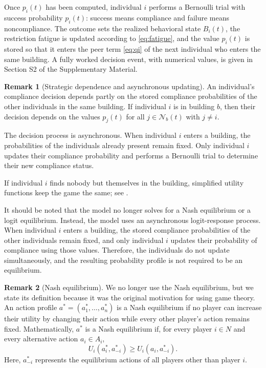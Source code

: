 \documentclass[11pt]{article}
\theoremstyle{definition}
\newtheorem{remark}{Remark}[section]
\theoremstyle{plain}
\begin{document}
Once $p_i(t)$ has been computed, individual $i$ performs a Bernoulli trial with success probability $p_i(t)$: success means compliance and failure means noncompliance. The outcome sets the realized behavioral state $B_i(t)$, the restriction fatigue is updated according to \eqref{eq:fatigue}, and the value $p_i(t)$ is stored so that it enters the peer term \eqref{eq:qi} of the next individual who enters the same building. A fully worked decision event, with numerical values, is given in Section S2 of the Supplementary Material.

\begin{remark}[Strategic dependence and asynchronous updating]
\label{rem:async}
An individual's compliance decision depends partly on the stored compliance probabilities of the other individuals in the same building. If individual $i$ is in building $b$, then their decision depends on the values $p_j(t)$ for all $j\in\mathcal{N}_b(t)$ with $j\neq i$.

The decision process is asynchronous. When individual $i$ enters a building, the probabilities of the individuals already present remain fixed. Only individual $i$ updates their compliance probability and performs a Bernoulli trial to determine their new compliance status.

If individual $i$ finds nobody but themselves in the building, simplified utility functions keep the game the same; see .

It should be noted that the model no longer solves for a Nash equilibrium or a logit equilibrium. Instead, the model uses an asynchronous logit-response process. When individual $i$ enters a building, the stored compliance probabilities of the other individuals remain fixed, and only individual $i$ updates their probability of compliance using those values. Therefore, the individuals do not update simultaneously, and the resulting probability profile is not required to be an equilibrium.
\end{remark}

\begin{remark}[Nash equilibrium]
\label{rem:nash}
We no longer use the Nash equilibrium, but we state its definition because it was the original motivation for using game theory.
An action profile $a^*=(a_1^*,\ldots,a_n^*)$ is a Nash equilibrium if no player can increase their utility by changing their action while every other player's action remains fixed. Mathematically, $a^*$ is a Nash equilibrium if, for every player $i\in N$ and every alternative action $a_i\in A_i$,
\[
U_i(a_i^*,a_{-i}^*)\geq U_i(a_i,a_{-i}^*).
\]
Here, $a_{-i}^*$ represents the equilibrium actions of all players other than player $i$.
\end{remark}
\end{document}
